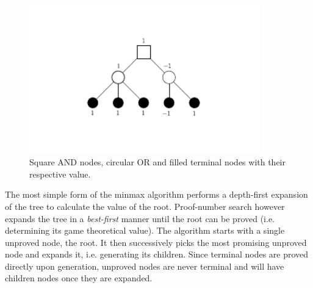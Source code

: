 \documentclass[a4paper, 11pt]{article}
\begin{document}
\begin{figure}[h]
\center
\includegraphics[width=10cm]{simpleminmax.pdf}
\caption{Square AND nodes, circular OR and filled terminal nodes with their respective value.}
\label{tree:simple}
\end{figure}

The most simple form of the minmax algorithm performs a depth-first expansion of the tree to calculate the value of the root. Proof-number search however
expands the tree in a \textit{best-first} manner until the root can be proved (i.e. determining its game theoretical value). The algorithm starts with a single
unproved node, the root. It then successively picks the most promising unproved node and expands it, i.e. generating its children. Since terminal nodes are proved
directly upon generation, unproved nodes are never terminal and will have children nodes once they are expanded. 
\end{document}
